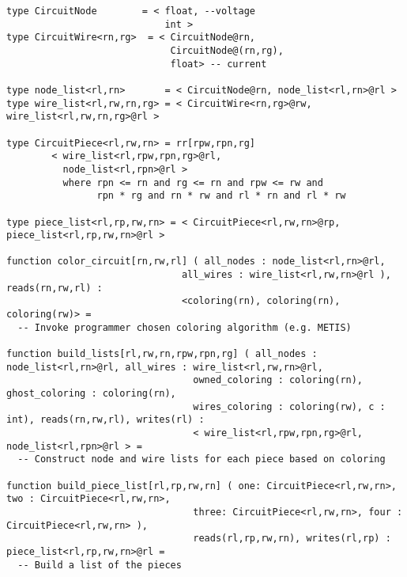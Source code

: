 \begin{lstlisting}[float={t},label={lst:code_ex},caption={Circuit simulation.}]
type CircuitNode        = < float, --voltage
                            int >
type CircuitWire<rn,rg>  = < CircuitNode@rn,
                             CircuitNode@(rn,rg),
                             float> -- current

type node_list<rl,rn>       = < CircuitNode@rn, node_list<rl,rn>@rl >
type wire_list<rl,rw,rn,rg> = < CircuitWire<rn,rg>@rw, wire_list<rl,rw,rn,rg>@rl >

type CircuitPiece<rl,rw,rn> = rr[rpw,rpn,rg]
        < wire_list<rl,rpw,rpn,rg>@rl,
          node_list<rl,rpn>@rl >         
          where rpn <= rn and rg <= rn and rpw <= rw and
                rpn * rg and rn * rw and rl * rn and rl * rw

type piece_list<rl,rp,rw,rn> = < CircuitPiece<rl,rw,rn>@rp, piece_list<rl,rp,rw,rn>@rl >

function color_circuit[rn,rw,rl] ( all_nodes : node_list<rl,rn>@rl,
                               all_wires : wire_list<rl,rw,rn>@rl ), reads(rn,rw,rl) : 
                               <coloring(rn), coloring(rn), coloring(rw)> =  
  -- Invoke programmer chosen coloring algorithm (e.g. METIS)

function build_lists[rl,rw,rn,rpw,rpn,rg] ( all_nodes : node_list<rl,rn>@rl, all_wires : wire_list<rl,rw,rn>@rl,
                                 owned_coloring : coloring(rn), ghost_coloring : coloring(rn),
                                 wires_coloring : coloring(rw), c : int), reads(rn,rw,rl), writes(rl) :
                                 < wire_list<rl,rpw,rpn,rg>@rl, node_list<rl,rpn>@rl > = 
  -- Construct node and wire lists for each piece based on coloring

function build_piece_list[rl,rp,rw,rn] ( one: CircuitPiece<rl,rw,rn>, two : CircuitPiece<rl,rw,rn>,
                                 three: CircuitPiece<rl,rw,rn>, four : CircuitPiece<rl,rw,rn> ),
                                 reads(rl,rp,rw,rn), writes(rl,rp) : piece_list<rl,rp,rw,rn>@rl =
  -- Build a list of the pieces


\end{lstlisting}

